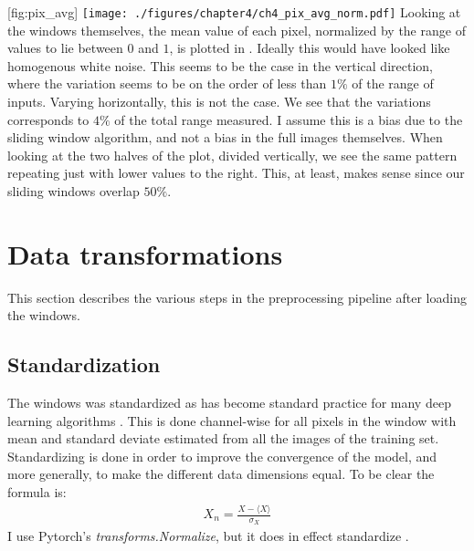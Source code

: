 [fig:pix_avg]
{\texttt{[image: ./figures/chapter4/ch4\_pix\_avg\_norm.pdf]}}
Looking at the windows themselves, the mean value of each pixel, normalized by the range of values to lie between $0$ and $1$, is plotted in . Ideally this would have looked like homogenous white noise. This seems to be the case in the vertical direction, where the variation seems to be on the order of less than $1 \%$ of the range of inputs.
Varying horizontally, this is not the case.
We see that the variations corresponds to $4\%$ of the total range measured.
I assume this is a bias due to the sliding window algorithm, and not a bias in the full images themselves. 
When looking at the two halves of the plot, divided vertically, we see the same pattern repeating just with lower values to the right. This, at least, makes sense since our sliding windows overlap $50\%$.
\section{Data transformations}
\label{sec:dataaug}
This section describes the various steps in the preprocessing pipeline after loading the windows.
\subsection{Standardization}
\label{sec:standardization}
The windows was standardized as has become standard practice for many deep learning algorithms \cite{lecunEfficientBackProp2012}. This is done channel-wise for all pixels in the window with mean and standard deviate estimated from all the images of the training set.
Standardizing is done in order to improve the convergence of the model, and more generally, to make the different data dimensions equal. To be clear the formula is: 
\begin{align}
	X_n = \frac{X-\langle X \rangle}{\sigma_X}
\end{align}
I use Pytorch's \textit{transforms.Normalize}, but it does in effect standardize \cite{TorchvisionTransformsPyTorch}.

